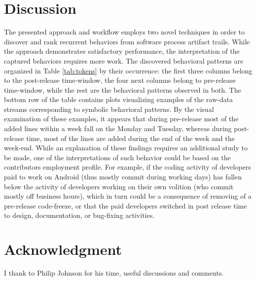 \documentclass[conference]{IEEEtran}
\begin{document}
\section{Discussion}
The presented approach and workflow employs two novel techniques in order to discover and 
rank recurrent behaviors from software process artifact trails. While the approach 
demonstrates satisfactory performance, the interpretation of the captured behaviors requires
more work. 
The discovered behavioral patterns are organized in Table \ref{tab:tokens} by their 
occurrence: the first three columns belong to the post-release time-window, the four next 
columns belong to pre-release time-window, while the rest are the behavioral patterns observed 
in both. 
The bottom row of the table contains plots visualizing examples of the raw-data streams 
corresponding to symbolic behavioral patterns. By the visual examination of these examples, 
it appears that during pre-release most of the added lines within a week fall on the 
Monday and Tuesday, whereas during post-release time, most of the lines are added during the 
end of the week and the week-end. While an explanation of these findings requires an additional
study to be made, one of the interpretations of such behavior could be based on the 
contributors employment profile. For example, if the coding activity of developers paid 
to work on Android (thus mostly commit during working days) has fallen below the activity of 
developers working on their own volition (who commit mostly off business hours), which in turn 
could be a consequence of removing of a pre-release code-freeze, or that the paid developers 
switched in post release time to design, documentation, or bug-fixing activities.

\section{Acknowledgment}
I thank to Philip Johnson for his time, useful discussions and comments.

%
%
\end{document}
